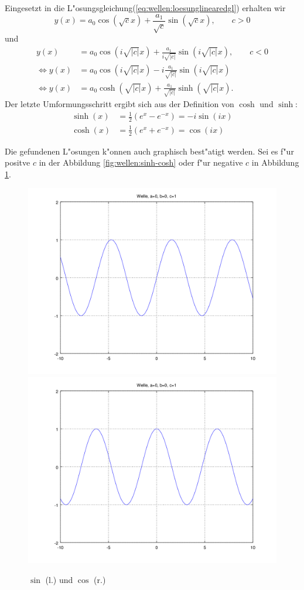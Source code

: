 Eingesetzt in die L"osungsgleichung(\ref{eq:wellen:loesunglinearedgl}) erhalten 
wir
\begin{equation*}
	y(x) = a_0 \cos(\sqrt{c}x) + \frac{a_1}{\sqrt{c}} \sin(\sqrt{c}x), \qquad c 
	> 0
\end{equation*}
und
\begin{equation}
	\begin{split}
		y(x) &= a_0 \cos(i\sqrt{|c|}x) + 
		\frac{a_1}{i\sqrt{|c|}}\sin(i\sqrt{|c|}x), \qquad c < 0\\
		\Leftrightarrow
		y(x) &= a_0 \cos(i\sqrt{|c|}x) - 
		i\frac{a_1}{\sqrt{|c|}}\sin(i\sqrt{|c|}x)\\
		\Leftrightarrow
		y(x) &= a_0 \cosh(\sqrt{|c|}x) + 
		\frac{a_1}{\sqrt{|c|}}\sinh(\sqrt{|c|}x).
	\end{split}	
\end{equation}
Der letzte Umformungsschritt ergibt sich aus der Definition von $\cosh$ und 
$\sinh$:
\begin{equation*}
	\begin{split}
		\sinh(x) &= \frac{1}{2} (e^x - e^{-x}) = -i \sin(ix)\\
		\cosh(x) &= \frac{1}{2} (e^x + e^{-x}) = \cos (ix)
	\end{split}
\end{equation*}

Die gefundenen L"osungen k"onnen auch graphisch best"atigt werden. Sei es f"ur 
positve $c$ in der Abbildung \ref{fig:wellen:sinh-cosh} oder f"ur negative $c$ 
in Abbildung \ref{fig:wellen:sin-cos}.

\begin{figure}
	\includegraphics[width=0.5\hsize]{./wellen/images/basicfunctions/sin.png}
	\includegraphics[width=0.5\hsize]{./wellen/images/basicfunctions/cos.png}
	\caption{$\sin$ (l.) und $\cos$ (r.)}
	\label{fig:wellen:sin-cos}
\end{figure}


